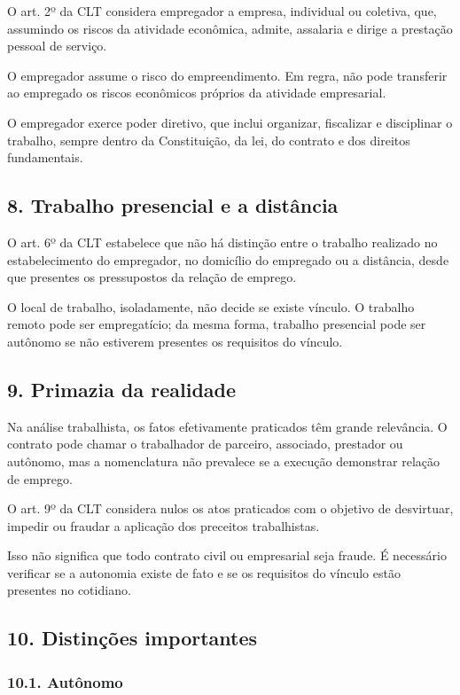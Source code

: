 \documentclass[11pt,a4paper]{article}
\begin{document}
O art. 2º da CLT considera empregador a empresa, individual ou coletiva, que, assumindo os riscos da atividade econômica, admite, assalaria e dirige a prestação pessoal de serviço.

O empregador assume o risco do empreendimento. Em regra, não pode transferir ao empregado os riscos econômicos próprios da atividade empresarial.

O empregador exerce poder diretivo, que inclui organizar, fiscalizar e disciplinar o trabalho, sempre dentro da Constituição, da lei, do contrato e dos direitos fundamentais.

\subsection*{8. Trabalho presencial e a distância}

O art. 6º da CLT estabelece que não há distinção entre o trabalho realizado no estabelecimento do empregador, no domicílio do empregado ou a distância, desde que presentes os pressupostos da relação de emprego.

O local de trabalho, isoladamente, não decide se existe vínculo. O trabalho remoto pode ser empregatício; da mesma forma, trabalho presencial pode ser autônomo se não estiverem presentes os requisitos do vínculo.

\subsection*{9. Primazia da realidade}

Na análise trabalhista, os fatos efetivamente praticados têm grande relevância. O contrato pode chamar o trabalhador de parceiro, associado, prestador ou autônomo, mas a nomenclatura não prevalece se a execução demonstrar relação de emprego.

O art. 9º da CLT considera nulos os atos praticados com o objetivo de desvirtuar, impedir ou fraudar a aplicação dos preceitos trabalhistas.

Isso não significa que todo contrato civil ou empresarial seja fraude. É necessário verificar se a autonomia existe de fato e se os requisitos do vínculo estão presentes no cotidiano.

\subsection*{10. Distinções importantes}

\subsubsection*{10.1. Autônomo}
\end{document}
